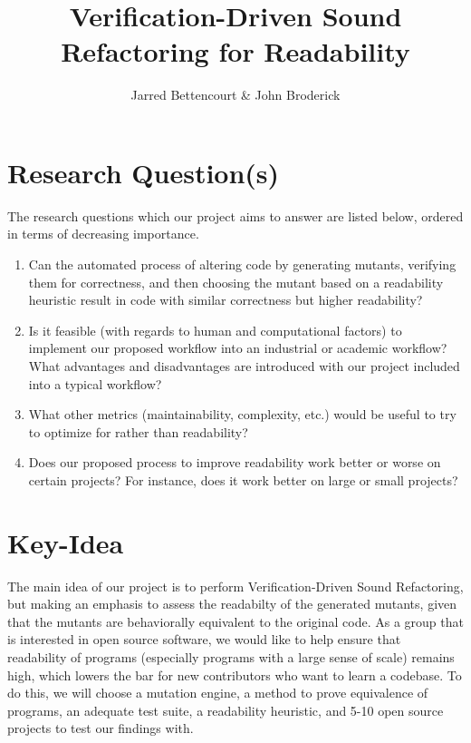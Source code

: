 \documentclass{article}
\title{Verification-Driven Sound Refactoring for Readability}
\author{Jarred Bettencourt \& John Broderick}
\begin{document}
\maketitle



\section{Research Question(s)}

The research questions which our project aims to answer are listed below, ordered in terms of decreasing importance.

\begin{enumerate}
    \item Can the automated process of altering code by generating mutants, verifying them for correctness, and then choosing the mutant based on a readability heuristic result in code with similar correctness but higher readability?
    \item Is it feasible (with regards to human and computational factors) to implement our proposed workflow into an industrial or academic workflow? What advantages and disadvantages are introduced with our project included into a typical workflow? 
    \item What other metrics (maintainability, complexity, etc.) would be useful to try to optimize for rather than readability? 
    \item Does our proposed process to improve readability work better or worse on certain projects? For instance, does it work better on large or small projects?
\end{enumerate}

\section{Key-Idea}
The main idea of our project is to perform Verification-Driven Sound Refactoring, but making an emphasis to assess the readabilty of the generated mutants, given that the mutants are behaviorally equivalent to the original code. As a group that is interested in open source software, we would like to help ensure that readability of programs (especially programs with a large sense of scale) remains high, which lowers the bar for new contributors who want to learn a codebase. To do this, we will choose a mutation engine, a method to prove equivalence of programs, an adequate test suite, a readability heuristic, and 5-10 open source projects to test our findings with.
\end{document}
